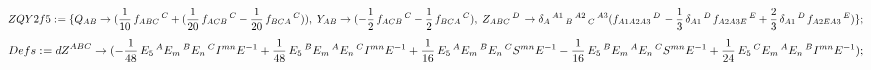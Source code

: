 \documentclass[11pt]{article}
\def\specialcolon{\mathrel{\mathop{:}}\hspace{-.5em}}
\begin{document}
\begin{dmath*}[compact, spread=2pt]
ZQY2f5\specialcolon{}= \{{Q}_{A B} \rightarrow (\frac{1}{10}\, {f}_{A B C}\,^{C} + (\frac{1}{20}\, {f}_{A C B}\,^{C} - \frac{1}{20}\, {f}_{B C A}\,^{C})),\; {Y}_{A B} \rightarrow ( - \frac{1}{2}\, {f}_{A C B}\,^{C} - \frac{1}{2}\, {f}_{B C A}\,^{C}),\; {Z}_{A B C}\,^{D\, } \rightarrow {\delta}_{A}\,^{A1}\,_{B}\,^{A2}\,_{C}\,^{A3} ({f}_{A1 A2 A3}\,^{D\, } - \frac{1}{3}\, {\delta}_{A1}\,^{D\, } {f}_{A2 A3 E}\,^{E} + \frac{2}{3}\, {\delta}_{A1}\,^{D\, } {f}_{A2 E A3}\,^{E})\};
\end{dmath*}
\begin{dmath*}[compact, spread=2pt]
Defs\specialcolon{}= {dZ}^{A B C} \rightarrow ( - \frac{1}{48}\, {E}_{5}\,^{A} {E}_{m}\,^{B} {E}_{n}\,^{C} {I}^{m n} E{}^{-1} + \frac{1}{48}\, {E}_{5}\,^{B} {E}_{m}\,^{A} {E}_{n}\,^{C} {I}^{m n} E{}^{-1} + \frac{1}{16}\, {E}_{5}\,^{A} {E}_{m}\,^{B} {E}_{n}\,^{C} {S}^{m n} E{}^{-1} - \frac{1}{16}\, {E}_{5}\,^{B} {E}_{m}\,^{A} {E}_{n}\,^{C} {S}^{m n} E{}^{-1} + \frac{1}{24}\, {E}_{5}\,^{C} {E}_{m}\,^{A} {E}_{n}\,^{B} {I}^{m n} E{}^{-1});
\end{dmath*}
\end{document}
